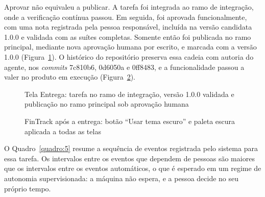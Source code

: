 Aprovar não equivaleu a publicar. A tarefa foi integrada ao ramo de integração, onde a verificação contínua passou. Em seguida, foi aprovada funcionalmente, com uma nota registrada pela pessoa responsável, incluída na versão candidata 1.0.0 e validada com as suítes completas. Somente então foi publicada no ramo principal, mediante nova aprovação humana por escrito, e marcada com a versão 1.0.0 (Figura~\ref{fig:16}). O histórico do repositório preserva essa cadeia com autoria do agente, nos \textit{commits} 7c810b6, 0d6050a e 0ff8483, e a funcionalidade passou a valer no produto em execução (Figura~\ref{fig:17}).

\begin{figure}[htb]
\centering
\caption{Tela Entrega: tarefa no ramo de integração, versão 1.0.0 validada e publicação no ramo principal sob aprovação humana}
\label{fig:16}
\end{figure}

\begin{figure}[htb]
\centering
\caption{FinTrack após a entrega: botão ``Usar tema escuro'' e paleta escura aplicada a todas as telas}
\label{fig:17}
\end{figure}

O Quadro~\ref{quadro:5} resume a sequência de eventos registrada pelo sistema para essa tarefa. Os intervalos entre os eventos que dependem de pessoas são maiores que os intervalos entre os eventos automáticos, o que é esperado em um regime de autonomia supervisionada: a máquina não espera, e a pessoa decide no seu próprio tempo.

